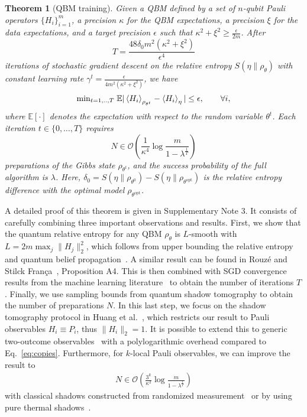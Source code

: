 \documentclass[
    reprint,
    aps,
    prx,
    longbibliography
]{revtex4-2}
\newtheorem{theorem}{Theorem}
\begin{document}
\begin{theorem}[QBM training]
\label{thm:training}
Given a QBM defined by a set of $n$-qubit Pauli operators $\{H_i\}_{i=1}^m$, a precision $\kappa$ for the QBM expectations, a precision $\xi$ for the data expectations, and a target precision $\epsilon$ such that $\kappa^2 + \xi^2 \geq \frac{\epsilon}{2m}$. After 
\begin{equation}
\label{eq:trainingsteps}
    T = \frac{48\delta_0 m^2  (\kappa^2 + \xi^2 )}{\epsilon^4}
\end{equation} 
iterations of stochastic gradient descent on the relative entropy $S(\eta \|\rho_\theta)$ with constant learning rate $\gamma^t=\frac{\epsilon}{4m^2(\kappa^2+\xi^2)}$, we have
\begin{equation}
    \mathrm{min}_{t=1,..,T} \; \mathbb{E}| \expval{H_i}_{\rho_{\theta^t}}  - \expval{H_i}_\eta | \leq \epsilon, \qquad \forall i,
\end{equation} where $\mathbb{E}[\cdot]$ denotes the expectation with respect to the random variable $\theta^t$. 
Each iteration $t \in \{0, \dots, T\}$ requires
\begin{equation}
\label{eq:copies}
    N \in \mathcal{O} \left( \frac{1}{{\kappa^4}} \log \frac{ m} { 1-\lambda^{\frac{1}{T}} } \right)
\end{equation}
preparations of the Gibbs state $\rho_{\theta^t}$, and the success probability of the full algorithm is $\lambda$. Here, $\delta_0 = S(\eta\|\rho_{\theta^0})-S(\eta\|\rho_{\theta^\mathrm{opt}})$ is the relative entropy difference with the optimal model $\rho_{\theta^\mathrm{opt}}$.
\end{theorem}

A detailed proof of this theorem is given in Supplementary Note 3.
It consists of carefully combining three important observations and results. First, we show that the quantum relative entropy for any QBM $\rho_\theta$ is $L$-smooth with $L=2m\max_j \|H_j\|_2^2$, which follows from upper bounding the relative entropy and quantum belief propagation~\cite{Hastings_2007}. A similar result can be found in Rouz\'{e} and Stilck Fran\c{c}a~\cite{Rouze_2023}, Proposition A4. This is then combined with SGD convergence results from the machine learning literature~\cite{Khaled2020, Garrigos2023} to obtain the number of iterations $T$. Finally, we use sampling bounds from quantum shadow tomography to obtain the number of preparations $N$. In this last step, we focus on the shadow tomography protocol in Huang et al.~\cite{Huang_2021}, which restricts our result to Pauli observables $H_i\equiv P_i$, thus $\|H_i\|_2 = 1$. It is possible to extend this to generic two-outcome observables~\cite{Aaronson_2017, Badescu2021} with a polylogarithmic overhead compared to Eq.~\eqref{eq:copies}. Furthermore, for $k$-local Pauli observables, we can improve the result to 
\begin{align}
    N \in \mathcal{O}\left( \frac{3^k}{\kappa^2} \log \frac{ m} { 1-\lambda^{\frac{1}{T}} } \right)
\end{align}
with classical shadows constructed from randomized measurement~\cite{Huang2020} or by using pure thermal shadows~\cite{Coopmans_2023}.
\end{document}
